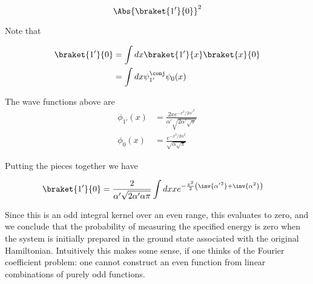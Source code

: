 {\begin{equation}\label{eqn:qmIexamPractice2008Dec:3:400}
\Abs{ \braket{1'}{0} }^2
\end{equation}

Note that 

\begin{equation}\label{eqn:qmIexamPractice:790}
\begin{aligned}
\braket{1'}{0} 
&=
\int dx \braket{1'}{x}\braket{x}{0} \\
&=
\int dx \psi_{1'}^\conj \psi_0(x) \\
\end{aligned}
\end{equation}

The wave functions above are
\begin{equation}\label{eqn:qmIexamPractice2008Dec:3:410}
\begin{aligned}
\phi_{1'}(x) &= \frac{ 2 x e^{-x^2/2 {\alpha'}^2 }}{ \alpha' \sqrt{ 2 \alpha' \sqrt{\pi} } } \\
\phi_{0}(x) &= \frac{ e^{-x^2/2 {\alpha}^2 } } { \sqrt{ \alpha \sqrt{\pi} } } 
\end{aligned}
\end{equation}

Putting the pieces together we have

\begin{equation}\label{eqn:qmIexamPractice2008Dec:3:810}
\begin{aligned}
\braket{1'}{0} 
&=
\frac{2 }{ \alpha' \sqrt{ 2 \alpha' \alpha \pi } }
\int dx
x e^{-\frac{x^2}{2}\left( \inv{{\alpha'}^2} + \inv{\alpha^2} \right) }
\end{aligned}
\end{equation}

Since this is an odd integral kernel over an even range, this evaluates to zero, and we conclude that the probability of measuring the specified energy is zero when the system is initially prepared in the ground state associated with the original Hamiltonian.  Intuitively this makes some sense, if one thinks of the Fourier coefficient problem: one cannot construct an even function from linear combinations of purely odd functions.
} %
